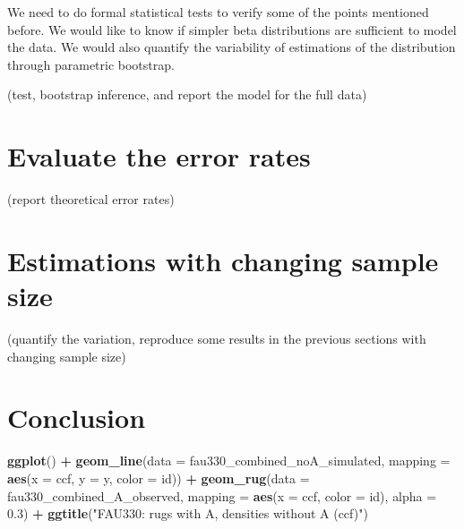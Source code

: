 \documentclass[]{elsarticle} %
\newenvironment{Shaded}{\begin{snugshade}}{\end{snugshade}}
\newcommand{\DataTypeTok}[1]{\textcolor[rgb]{0.13,0.29,0.53}{#1}}
\newcommand{\FloatTok}[1]{\textcolor[rgb]{0.00,0.00,0.81}{#1}}
\newcommand{\KeywordTok}[1]{\textcolor[rgb]{0.13,0.29,0.53}{\textbf{#1}}}
\newcommand{\NormalTok}[1]{#1}
\newcommand{\OperatorTok}[1]{\textcolor[rgb]{0.81,0.36,0.00}{\textbf{#1}}}
\newcommand{\StringTok}[1]{\textcolor[rgb]{0.31,0.60,0.02}{#1}}
\begin{document}
We need to do formal statistical tests to verify some of the points
mentioned before. We would like to know if simpler beta distributions
are sufficient to model the data. We would also quantify the variability
of estimations of the distribution through parametric bootstrap.

(test, bootstrap inference, and report the model for the full data)

\hypertarget{evaluate-the-error-rates}{%
\section{Evaluate the error rates}\label{evaluate-the-error-rates}}

(report theoretical error rates)

\hypertarget{estimations-with-changing-sample-size}{%
\section{Estimations with changing sample
size}\label{estimations-with-changing-sample-size}}

(quantify the variation, reproduce some results in the previous sections
with changing sample size)

\hypertarget{conclusion}{%
\section{Conclusion}\label{conclusion}}

\begin{Shaded}
\begin{Highlighting}[]
\KeywordTok{ggplot}\NormalTok{() }\OperatorTok{+}\StringTok{ }
\StringTok{  }\KeywordTok{geom_line}\NormalTok{(}\DataTypeTok{data =}\NormalTok{ fau330_combined_noA_simulated, }
            \DataTypeTok{mapping =} \KeywordTok{aes}\NormalTok{(}\DataTypeTok{x =}\NormalTok{ ccf, }\DataTypeTok{y =}\NormalTok{ y, }\DataTypeTok{color =}\NormalTok{ id)) }\OperatorTok{+}\StringTok{ }
\StringTok{  }\KeywordTok{geom_rug}\NormalTok{(}\DataTypeTok{data =}\NormalTok{ fau330_combined_A_observed, }
           \DataTypeTok{mapping =} \KeywordTok{aes}\NormalTok{(}\DataTypeTok{x =}\NormalTok{ ccf, }\DataTypeTok{color =}\NormalTok{ id), }\DataTypeTok{alpha =} \FloatTok{0.3}\NormalTok{) }\OperatorTok{+}
\StringTok{  }\KeywordTok{ggtitle}\NormalTok{(}\StringTok{"FAU330: rugs with A, densities without A (ccf)"}\NormalTok{)}
\end{Highlighting}
\end{Shaded}
\end{document}

